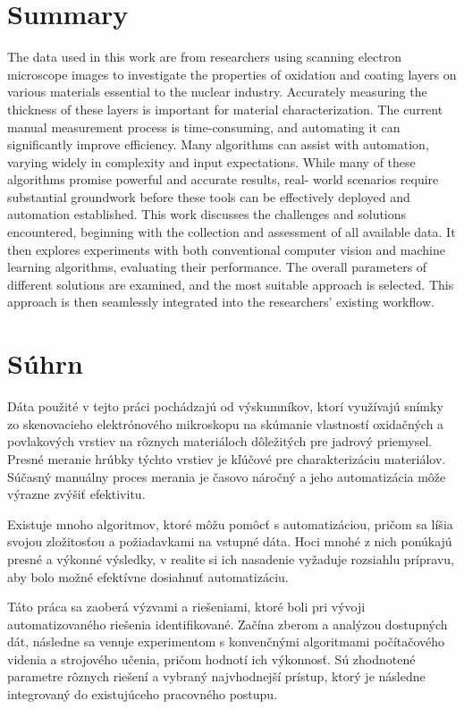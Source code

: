 \chapter*{Summary}
The data used in this work are from researchers using scanning electron microscope images
to investigate the properties of oxidation and coating layers on various materials essential to
the nuclear industry. Accurately measuring the thickness of these layers is important for
material characterization. The current manual measurement process is time-consuming, and
automating it can significantly improve efficiency.
Many algorithms can assist with automation, varying widely in complexity and input
expectations. While many of these algorithms promise powerful and accurate results, real-
world scenarios require substantial groundwork before these tools can be effectively
deployed and automation established.
This work discusses the challenges and solutions encountered, beginning with the collection and
assessment of all available data. It then explores experiments with both conventional
computer vision and machine learning algorithms, evaluating their performance. The overall
parameters of different solutions are examined, and the most suitable approach is selected.
This approach is then seamlessly integrated into the researchers' existing workflow.
\newpage
\chapter*{Súhrn}
Dáta použité v tejto práci pochádzajú od výskumníkov, ktorí využívajú snímky zo skenovacieho elektrónového mikroskopu na skúmanie vlastností oxidačných a povlakových vrstiev na rôznych materiáloch dôležitých pre jadrový priemysel. Presné meranie hrúbky týchto vrstiev je kľúčové pre charakterizáciu materiálov. Súčasný manuálny proces merania je časovo náročný a jeho automatizácia môže výrazne zvýšiť efektivitu.

Existuje mnoho algoritmov, ktoré môžu pomôcť s automatizáciou, pričom sa líšia svojou zložitosťou a požiadavkami na vstupné dáta. Hoci mnohé z nich ponúkajú presné a výkonné výsledky, v realite si ich nasadenie vyžaduje rozsiahlu prípravu, aby bolo možné efektívne dosiahnuť automatizáciu.

Táto práca sa zaoberá výzvami a riešeniami, ktoré boli pri vývoji automatizovaného riešenia identifikované. Začína zberom a analýzou dostupných dát, následne sa venuje experimentom s konvenčnými algoritmami počítačového videnia a strojového učenia, pričom hodnotí ich výkonnosť. Sú zhodnotené parametre rôznych riešení a vybraný najvhodnejší prístup, ktorý je následne integrovaný do existujúceho pracovného postupu.
\newpage

